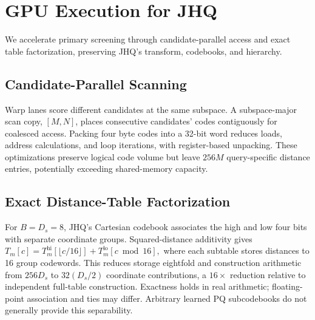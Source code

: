 



\section{GPU Execution for JHQ}
\label{sec:gpu_execution}
We accelerate primary screening through candidate-parallel access and exact table factorization, preserving JHQ's transform, codebooks, and hierarchy.

\subsection{Candidate-Parallel Scanning}
\label{sec:candidate_parallel}
Warp lanes score different candidates at the same subspace. A subspace-major scan copy, $[M,N]$, places consecutive candidates' codes contiguously for coalesced access. Packing four byte codes into a 32-bit word reduces loads, address calculations, and loop iterations, with register-based unpacking. These optimizations preserve logical code volume but leave $256M$ query-specific distance entries, potentially exceeding shared-memory capacity.

\subsection{Exact Distance-Table Factorization}
\label{sec:table_factorization}
For $B=D_s=8$, JHQ's Cartesian codebook associates the high and low four bits with separate coordinate groups. Squared-distance additivity gives
$
T_m[c]=T_m^{\mathrm{hi}}[\lfloor c/16\rfloor]+T_m^{\mathrm{lo}}[c\bmod16],
\label{eq:table_factorization}
$
where each subtable stores distances to 16 group codewords. This reduces storage eightfold and construction arithmetic from $256D_s$ to $32(D_s/2)$ coordinate contributions, a $16\times$ reduction relative to independent full-table construction. Exactness holds in real arithmetic; floating-point association and ties may differ. Arbitrary learned PQ subcodebooks do not generally provide this separability.


